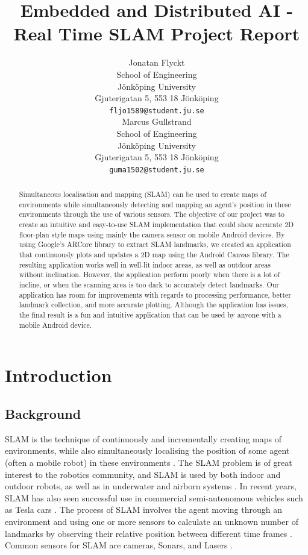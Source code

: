 \documentclass{article}
\title{Embedded and Distributed AI - Real Time SLAM Project Report}
\author{
 Jonatan Flyckt \\
  School of Engineering\\
  Jönköping University\\
  Gjuterigatan 5, 553 18 Jönköping \\
  \texttt{fljo1589@student.ju.se} \\
   \And
 Marcus Gullstrand \\
  School of Engineering\\
  Jönköping University\\
  Gjuterigatan 5, 553 18 Jönköping \\
  \texttt{guma1502@student.ju.se} \\
}
\begin{document}
\maketitle
\begin{abstract}

Simultaneous localisation and mapping (SLAM) can be used to create maps of environments while simultaneously detecting and mapping an agent's position in these environments through the use of various sensors. The objective of our project was to create an intuitive and easy-to-use SLAM implementation that could show accurate 2D floor-plan style maps using mainly the camera sensor on mobile Android devices. By using Google's ARCore library to extract SLAM landmarks, we created an application that continuously plots and updates a 2D map using the Android Canvas library. The resulting application works well in well-lit indoor areas, as well as outdoor areas without inclination. However, the application perform poorly when there is a lot of incline, or when the scanning area is too dark to accurately detect landmarks. Our application has room for improvements with regards to processing performance, better landmark collection, and more accurate plotting. Although the application has issues, the final result is a fun and intuitive application that can be used by anyone with a mobile Android device.

\end{abstract}

\section{Introduction}
\subsection{Background}

SLAM is the technique of continuously and incrementally creating maps of environments, while also simultaneously localising the position of some agent (often a mobile robot) in these environments \cite{background1}. The SLAM problem is of great interest to the robotics community, and SLAM is used by both indoor and outdoor robots, as well as in underwater and airborn systems \cite{background1}. In recent years, SLAM has also seen successful use in commercial semi-autonomous vehicles such as Tesla cars \cite{autonomous-cars}. The process of SLAM involves the agent moving through an environment and using one or more sensors to calculate an unknown number of landmarks by observing their relative position between different time frames \cite{background1}. Common sensors for SLAM are cameras, Sonars, and Lasers \cite{background2}.
\end{document}
